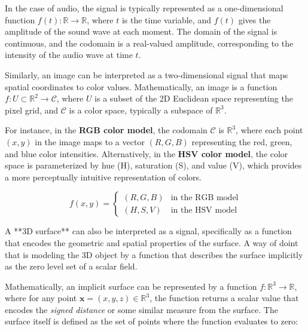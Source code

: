 In the case of audio, the signal is typically represented as a one-dimensional function \( f(t): \mathbb{R} \to \mathbb{R} \), where \( t \) is the time variable, and \( f(t) \) gives the amplitude of the sound wave at each moment. The domain of the signal is continuous, and the codomain is a real-valued amplitude, corresponding to the intensity of the audio wave at time \( t \).



Similarly, an image can be interpreted as a two-dimensional signal that maps spatial coordinates to color values. Mathematically, an image is a function \( f: U \subset \mathbb{R}^2 \to \mathcal{C} \), where \( U \) is a subset of the 2D Euclidean space representing the pixel grid, and \( \mathcal{C} \) is a color space, typically a subspace of \( \mathbb{R}^3 \). 

For instance, in the \textbf{RGB color model}, the codomain \( \mathcal{C} \) is \( \mathbb{R}^3 \), where each point \( (x, y) \) in the image maps to a vector \( (R, G, B) \) representing the red, green, and blue color intensities. Alternatively, in the \textbf{HSV color model}, the color space is parameterized by hue (H), saturation (S), and value (V), which provides a more perceptually intuitive representation of colors.

\[
f(x, y) = \begin{cases}
(R, G, B) & \text{in the RGB model} \\
(H, S, V) & \text{in the HSV model}
\end{cases}
\]

A **3D surface** can also be interpreted as a signal, specifically as a function that encodes the geometric and spatial properties of the surface. A way of doint that is modeling the 3D object by a function that describes the surface implicitly as the zero level set of a scalar field.

Mathematically, an implicit surface can be represented by a function \( f : \mathbb{R}^3 \rightarrow \mathbb{R} \), where for any point \( \mathbf{x} = (x, y, z) \in \mathbb{R}^3 \), the function returns a scalar value that encodes the \textit{signed distance} or some similar measure from the surface. The surface itself is defined as the set of points where the function evaluates to zero:

